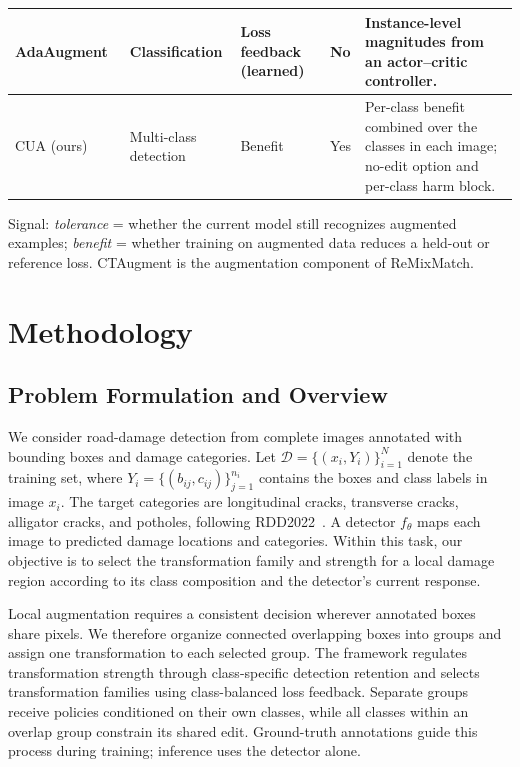\documentclass[conference]{IEEEtran}
\begin{document}
\begin{table}[t]
\begin{tabularx}{\textwidth}{@{}p{}p{}p{}p{}Y@{}}
AdaAugment~\cite{yang2025adaaugment} & Classification & Loss feedback (learned) & No & Instance-level magnitudes from an actor--critic controller. \\
\midrule
CUA (ours) & Multi-class detection & Benefit & Yes & Per-class benefit combined over the classes in each image; no-edit option and per-class harm block. \\
\bottomrule
\end{tabularx}
\vspace{3pt}
\begin{minipage}{\textwidth}
\footnotesize
Signal: \emph{tolerance} = whether the current model still recognizes augmented examples; \emph{benefit} = whether training on augmented data reduces a held-out or reference loss. CTAugment is the augmentation component of ReMixMatch.
\end{minipage}
\end{table}

\section{Methodology}
\label{sec:method}

\subsection{Problem Formulation and Overview}
\label{sec:method_problem}

We consider road-damage detection from complete images annotated with bounding boxes and damage categories. Let $\mathcal{D}=\{(x_i,Y_i)\}_{i=1}^{N}$ denote the training set, where $Y_i=\{(b_{ij},c_{ij})\}_{j=1}^{n_i}$ contains the boxes and class labels in image $x_i$. The target categories are longitudinal cracks, transverse cracks, alligator cracks, and potholes, following RDD2022~\cite{arya2024rdd}. A detector $f_\theta$ maps each image to predicted damage locations and categories. Within this task, our objective is to select the transformation family and strength for a local damage region according to its class composition and the detector's current response.

Local augmentation requires a consistent decision wherever annotated boxes share pixels. We therefore organize connected overlapping boxes into groups and assign one transformation to each selected group. The framework regulates transformation strength through class-specific detection retention and selects transformation families using class-balanced loss feedback. Separate groups receive policies conditioned on their own classes, while all classes within an overlap group constrain its shared edit. Ground-truth annotations guide this process during training; inference uses the detector alone.
\end{document}
